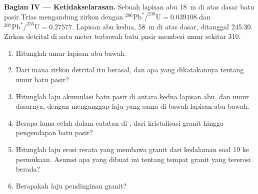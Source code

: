 \begin{problem}
\noindent\textbf{Bagian IV --- Ketidakselarasan.} Sebuah lapisan abu \qty{18}{m} di atas dasar batu pasir Trias mengandung zirkon dengan
$^{206}\mathrm{Pb}^*/^{238}\mathrm{U} = 0.039108$ dan
$^{207}\mathrm{Pb}^*/^{235}\mathrm{U} = 0.27577$. Lapisan abu kedua, \qty{58}{m}
di atas dasar, ditanggal \qty{245.30}{\Ma}. Zirkon detrital di satu meter terbawah
batu pasir memberi umur sekitar \qty{310}{\Ma}.
\begin{enumerate}[resume]
  \item Hitunglah umur lapisan abu bawah.
  \item Dari mana zirkon detrital itu berasal, dan apa yang dikatakannya tentang umur batu pasir?
  \item Hitunglah laju akumulasi batu pasir di antara kedua lapisan abu, dan umur dasarnya, dengan menganggap laju yang sama di bawah lapisan abu bawah.
  \item Berapa lama celah dalam catatan di , dari kristalisasi granit hingga pengendapan batu pasir?
  \item Hitunglah laju erosi rerata yang membawa granit dari kedalaman soal 19 ke permukaan. Asumsi apa yang dibuat ini tentang tempat granit yang tererosi berada?
  \item Berapakah laju pendinginan granit?
\end{enumerate}
\end{problem}
